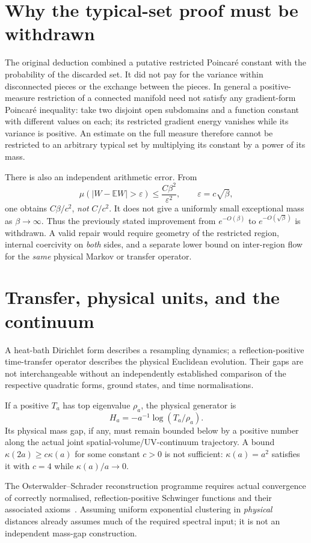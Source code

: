 \documentclass[11pt,a4paper]{article}
\theoremstyle{remark}
\begin{document}
\section{Why the typical-set proof must be withdrawn}
The original deduction combined a putative restricted
Poincar\'e constant with the probability of the discarded
set. It did not pay for the variance within disconnected
pieces or the exchange between the pieces. In general a
positive-measure restriction of a connected manifold need
not satisfy any gradient-form Poincar\'e inequality:
take two disjoint open subdomains and a function constant
with different values on each; its restricted gradient
energy vanishes while its variance is positive.
An estimate on the full measure therefore cannot be
restricted to an arbitrary typical set by multiplying
its constant by a power of its mass.

There is also an independent arithmetic error.
From
\[
\mu(|W-\mathbb EW|>\varepsilon)
\le\frac{C\beta^2}{\varepsilon^2},
\qquad \varepsilon=c\sqrt\beta,
\]
one obtains $C\beta/c^2$, \emph{not} $C/c^2$.
It does not give a uniformly small exceptional mass as
$\beta\to\infty$. Thus the previously stated improvement
from $e^{-O(\beta)}$ to $e^{-O(\sqrt\beta)}$ is withdrawn.
A valid repair would require geometry of the restricted
region, internal coercivity on \emph{both} sides, and a
separate lower bound on inter-region flow for the
\emph{same} physical Markov or transfer operator.

\section{Transfer, physical units, and the continuum}
A heat-bath Dirichlet form describes a resampling
dynamics; a reflection-positive time-transfer operator
describes the physical Euclidean evolution. Their gaps
are not interchangeable without an independently
established comparison of the respective quadratic
forms, ground states, and time normalisations.

If a positive $T_a$ has top eigenvalue $\rho_a$, the
physical generator is
\[
H_a=-a^{-1}\log(T_a/\rho_a).
\]
Its physical mass gap, if any, must remain bounded below
by a positive number along the actual joint
spatial-volume/UV-continuum trajectory.
A bound $\kappa(2a)\ge c\kappa(a)$
for some constant $c>0$ is not sufficient:
$\kappa(a)=a^2$ satisfies it with $c=4$ while
$\kappa(a)/a\to0$.

The Osterwalder--Schrader reconstruction programme
requires actual convergence of correctly normalised,
reflection-positive Schwinger functions and their
associated axioms~\cite{OS1,OS2}. Assuming uniform
exponential clustering in \emph{physical} distances
already assumes much of the required spectral input;
it is not an independent mass-gap construction.
\end{document}
